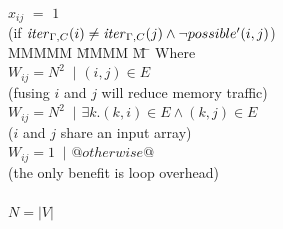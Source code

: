 \begin{tabbing}
\\
           \> $x_{ij}$    \> $=$   \> $1$             \>       \>            \\
           \> (if $\mathit{iter}_{\Gamma,C}(i) \not= \mathit{iter}_{\Gamma,C}(j) \wedge \neg possible'(i,j)$) \\
MMMMM   \= MMMM \= M \= \kill
Where      \>                                       \\
           \> $W_{ij} = N^2$ \> $~|$ \> $(i,j) \in E $         \\
           \> \> \> (fusing $i$ and $j$ will reduce memory traffic)         \\
           \> $W_{ij} = N^2$ \> $~|$ \> $\exists k. (k,i) \in E \wedge (k,j) \in E $     \\
           \> \> \> ($i$ and $j$ share an input array)                                         \\
           \> $W_{ij} = 1$   \> $~|$ \> $@otherwise@$                                                  \\
           \> \> \> (the only benefit is loop overhead)                                        \\
           \\
           \> $N = |V|$
\end{tabbing}

% 
